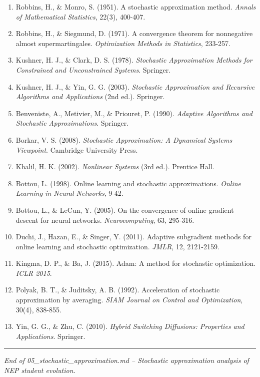 \documentclass[
  12pt,
]{article}
\providecommand{\tightlist}{%
  \setlength{\itemsep}{0pt}\setlength{\parskip}{0pt}}
\begin{document}
\begin{enumerate}
\def\labelenumi{\arabic{enumi}.}
\tightlist
\item
  Robbins, H., \& Monro, S. (1951). A stochastic approximation method.
  \emph{Annals of Mathematical Statistics}, 22(3), 400-407.
\item
  Robbins, H., \& Siegmund, D. (1971). A convergence theorem for
  nonnegative almost supermartingales. \emph{Optimization Methods in
  Statistics}, 233-257.
\item
  Kushner, H. J., \& Clark, D. S. (1978). \emph{Stochastic Approximation
  Methods for Constrained and Unconstrained Systems}. Springer.
\item
  Kushner, H. J., \& Yin, G. G. (2003). \emph{Stochastic Approximation
  and Recursive Algorithms and Applications} (2nd ed.). Springer.
\item
  Benveniste, A., Metivier, M., \& Priouret, P. (1990). \emph{Adaptive
  Algorithms and Stochastic Approximations}. Springer.
\item
  Borkar, V. S. (2008). \emph{Stochastic Approximation: A Dynamical
  Systems Viewpoint}. Cambridge University Press.
\item
  Khalil, H. K. (2002). \emph{Nonlinear Systems} (3rd ed.). Prentice
  Hall.
\item
  Bottou, L. (1998). Online learning and stochastic approximations.
  \emph{Online Learning in Neural Networks}, 9-42.
\item
  Bottou, L., \& LeCun, Y. (2005). On the convergence of online gradient
  descent for neural networks. \emph{Neurocomputing}, 63, 295-316.
\item
  Duchi, J., Hazan, E., \& Singer, Y. (2011). Adaptive subgradient
  methods for online learning and stochastic optimization. \emph{JMLR},
  12, 2121-2159.
\item
  Kingma, D. P., \& Ba, J. (2015). Adam: A method for stochastic
  optimization. \emph{ICLR 2015}.
\item
  Polyak, B. T., \& Juditsky, A. B. (1992). Acceleration of stochastic
  approximation by averaging. \emph{SIAM Journal on Control and
  Optimization}, 30(4), 838-855.
\item
  Yin, G. G., \& Zhu, C. (2010). \emph{Hybrid Switching Diffusions:
  Properties and Applications}. Springer.
\end{enumerate}

\begin{center}\rule{0.5\linewidth}{0.5pt}\end{center}

\emph{End of 05\_stochastic\_approximation.md -- Stochastic
approximation analysis of NEP student evolution.}
\end{document}
